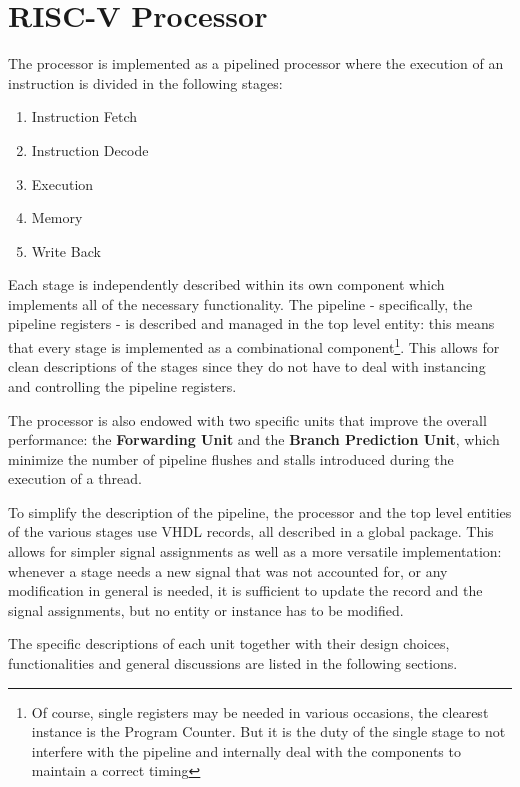 \section{RISC-V Processor}
The processor is implemented as a pipelined processor where the execution of an instruction is divided in the following
stages:
\begin{enumerate}
    \item Instruction Fetch
    \item Instruction Decode
    \item Execution
    \item Memory
    \item Write Back
\end{enumerate}

Each stage is independently described within its own component which implements all of the necessary functionality. The
pipeline - specifically, the pipeline registers - is described and managed in the top level entity:
this means that every stage is implemented as a combinational component\footnote{Of course, single registers may be
needed in various occasions, the clearest instance is the Program Counter. But it is the duty of the single stage to
not interfere with the pipeline and internally deal with the components to maintain a correct timing}. This allows for
clean descriptions of the stages since they do not have to deal with instancing and controlling the pipeline registers.

The processor is also endowed with two specific units that improve the overall performance: the
\textbf{Forwarding Unit} and the \textbf{Branch Prediction Unit}, which minimize the number of pipeline flushes and
stalls introduced during the execution of a thread.

To simplify the description of the pipeline, the processor and the top level entities of the various stages use
VHDL records, all described in a global package. This allows for simpler signal assignments as well as a more versatile
implementation: whenever a stage needs a new signal that was not accounted for, or any modification in general is
needed, it is sufficient to update the record and the signal assignments, but no entity or instance has to be modified.

The specific descriptions of each unit together with their design choices, functionalities and general discussions
are listed in the following sections.
